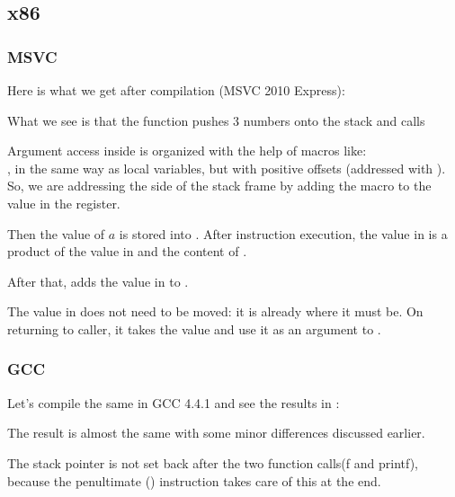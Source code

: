 \subsection{x86}

\subsubsection{MSVC}

Here is what we get after compilation (MSVC 2010 Express):




What we see is that the \main function pushes 3 numbers onto the stack and calls  

Argument access inside \ttf is organized with the help of macros like:\\
, 
in the same way as local variables, but with positive offsets (addressed with ).
So, we are addressing the  side of the \gls{stack frame} by adding the  macro to the value in the \EBP register.


Then the value of $a$ is stored into \EAX. After \IMUL instruction execution, the value in \EAX is 
a \gls{product} of the value in \EAX and the content of .

After that, \ADD adds the value in  to \EAX.

The value in \EAX does not need to be moved: it is already where it must be.
On returning to \gls{caller}, it takes the \EAX value and use it as an argument to \printf.



\subsubsection{GCC}

Let's compile the same in GCC 4.4.1 and see the results in \IDA:



The result is almost the same with some minor differences discussed earlier.

The \gls{stack pointer} is not set back after the two function calls(f and printf), 
because the penultimate  () 
instruction takes care of this at the end.
